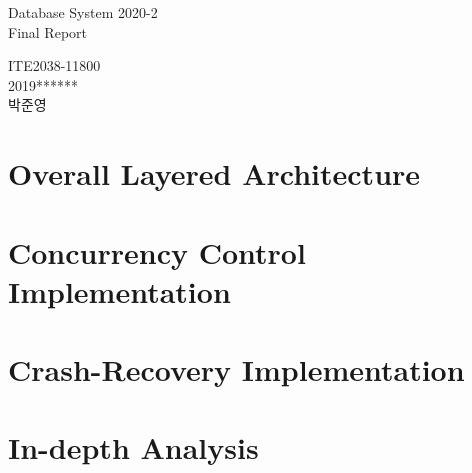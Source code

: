 \documentclass[a4paper, 11pt]{article}
\begin{document}
\begin{titlepage}
	\begin{center}
		\vspace*{3cm}
		\begin{LARGE}
		Database System 2020-2\\
		\vspace{0.5em}
		Final Report
		\end{LARGE}
	\end{center}

	\vspace{13cm}
	\begin{flushright}
		\begin{Large}
			ITE2038-11800\\
			2019******\\
			박준영
		\end{Large}
	\end{flushright}
\end{titlepage}
	
\tableofcontents
\newpage

\section{Overall Layered Architecture}


\section{Concurrency Control Implementation}


\section{Crash-Recovery Implementation}


\section{In-depth Analysis}

\end{document}
